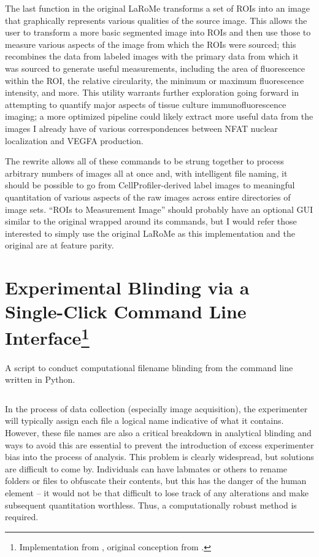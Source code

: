The last function in the original LaRoMe transforms a set of ROIs into an image that graphically represents various qualities of the source image. This allows the user to transform a more basic segmented image into ROIs and then use those to measure various aspects of the image from which the ROIs were sourced; this recombines the data from labeled images with the primary data from which it was sourced to generate useful measurements, including the area of fluorescence within the ROI, the relative circularity, the minimum or maximum fluorescence intensity, and more. This utility warrants further exploration going forward in attempting to quantify major aspects of tissue culture immunofluorescence imaging; a more optimized pipeline could likely extract more useful data from the images I already have of various correspondences between NFAT nuclear localization and VEGFA production.

The rewrite allows all of these commands to be strung together to process arbitrary numbers of images all at once and, with intelligent file naming, it should be possible to go from CellProfiler-derived label images to meaningful quantitation of various aspects of the raw images across entire directories of image sets. ``ROIs to Measurement Image'' should probably have an optional GUI similar to the original wrapped around its commands, but I would refer those interested to simply use the original LaRoMe as this implementation and the original are at feature parity.

\section[Experimental Blinding via a Single-Click Command Line Interface]{Experimental Blinding via a Single-Click Command Line Interface\footnote{Implementation from \citet{Brewer2022}, original conception from \citet{Salter2016}.}}\label{blinders}

\begin{code}
\caption{A script to conduct computational filename blinding from the command line written in Python.}
\label{blinder}

\inputminted[breaklines,frame=single,fontsize=\small]{python}{source/renamer.py}

\end{code}

In the process of data collection (especially image acquisition), the experimenter will typically assign each file a logical name indicative of what it contains. However, these file names are also a critical breakdown in analytical blinding and ways to avoid this are essential to prevent the introduction of excess experimenter bias into the process of analysis. This problem is clearly widespread, but solutions are difficult to come by. Individuals can have labmates or others to rename folders or files to obfuscate their contents, but this has the danger of the human element -- it would not be that difficult to lose track of any alterations and make subsequent quantitation worthless. Thus, a computationally robust method is required. 

